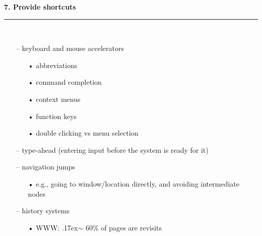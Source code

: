 \documentclass[pdf]{beamer}
\begin{document}
\begin{frame}
{\textbf{7. Provide shortcuts}}{\textcolor{red}{\rule{12cm}{1.2pt}}}

    \bigskip
    \\
    \begin{itemize}
    	
        \item[--] keyboard and mouse accelerators
        \begin{itemize}        	
        	\item[\textcolor{black}{•}] abbreviations        
            \item[\textcolor{black}{•}] command completion
             \item[\textcolor{black}{•}] context menus
              \item[\textcolor{black}{•}] function keys
              \item[\textcolor{black}{•}] double clicking vs menu selection
        \end{itemize}
        \item[--] type-ahead (entering input before the system is ready for it)
        \item[--] navigation jumps
        \begin{itemize}        	
        	\item[\textcolor{black}{•}] e.g., going to window/location directly, and avoiding intermediate nodes
           
        \end{itemize}
        \item[--] history systems
        \begin{itemize}        	
        	\item[\textcolor{black}{•}] WWW: {\raise.17ex\hbox{$\scriptstyle\mathtt{\sim}$}} 60\% of pages are revisits     
           
        \end{itemize}
    \end{itemize}

\end{frame}
\end{document}
